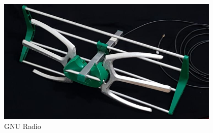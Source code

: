 \begin{frame}
\begin{columns}
\begin{itemize}
		\end{itemize}
		\begin{figure}
			\includegraphics[scale=0.20]{antena}
			\caption{GNU Radio}
		\end{figure}
\end{columns}
\end{frame}